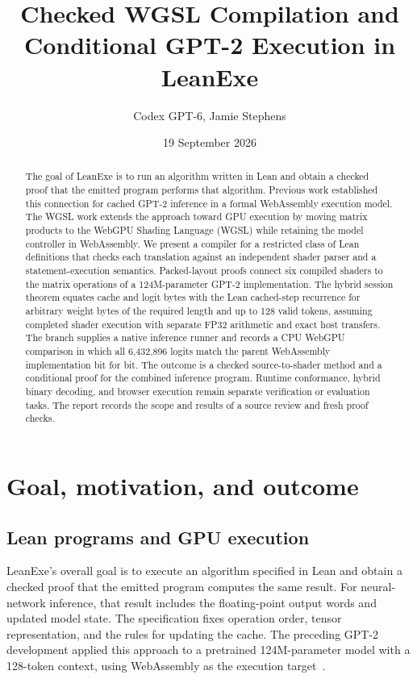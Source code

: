 \documentclass[11pt]{article}
\title{Checked WGSL Compilation and Conditional GPT-2 Execution in LeanExe}
\author{Codex GPT-6, Jamie Stephens}
\date{19 September 2026}
\begin{document}
\maketitle
\begin{abstract}
The goal of LeanExe is to run an algorithm written in Lean and obtain a checked proof that the emitted program performs that algorithm.  Previous work established this connection for cached GPT-2 inference in a formal WebAssembly execution model.  The WGSL work extends the approach toward GPU execution by moving matrix products to the WebGPU Shading Language (WGSL) while retaining the model controller in WebAssembly.  We present a compiler for a restricted class of Lean definitions that checks each translation against an independent shader parser and a statement-execution semantics.  Packed-layout proofs connect six compiled shaders to the matrix operations of a 124M-parameter GPT-2 implementation.  The hybrid session theorem equates cache and logit bytes with the Lean cached-step recurrence for arbitrary weight bytes of the required length and up to 128 valid tokens, assuming completed shader execution with separate FP32 arithmetic and exact host transfers.  The branch supplies a native inference runner and records a CPU WebGPU comparison in which all 6,432,896 logits match the parent WebAssembly implementation bit for bit.  The outcome is a checked source-to-shader method and a conditional proof for the combined inference program.  Runtime conformance, hybrid binary decoding, and browser execution remain separate verification or evaluation tasks.  The report records the scope and results of a source review and fresh proof checks.
\end{abstract}

\section{Goal, motivation, and outcome}

\subsection{Lean programs and GPU execution}

LeanExe's overall goal is to execute an algorithm specified in Lean and obtain a checked proof that the emitted program computes the same result.  For neural-network inference, that result includes the floating-point output words and updated model state.  The specification fixes operation order, tensor representation, and the rules for updating the cache.  The preceding GPT-2 development applied this approach to a pretrained 124M-parameter model with a 128-token context, using WebAssembly as the execution target~\cite{parent}.
\end{document}
